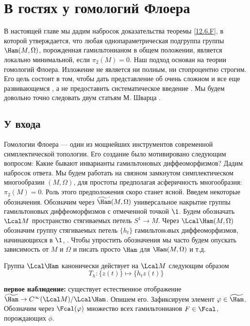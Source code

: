 \chapter[Гомологии Флоера]{В гостях у гомологий Флоера}\label{13}

В настоящей главе мы дадим набросок доказательства теоремы
\ref{12.6.F}, в которой утверждается, что любая однопараметрическая
подгруппа группы $\Ham(M, \Omega)$, порожденная гамильтонианом в общем
положении, является локально минимальной, если $π_{2}(M) = 0$.
Наш подход основан на теории гомологий Флоера.
Изложение не является
ни полным, ни стопроцентно строгим.
Его цель состоит в том, чтобы дать представление об очень сложном и
все еще развивающемся , а не
предоставить систематическое введение .
Мы будем довольно точно следовать двум статьям М. Шварца \cite{Sch2,
  Sch3}.

\section{У входа}\label{13.1}

Гомологии Флоера --- один из мощнейших инструментов современной
симплектической топологии. 
Его создание было мотивировано следующим вопросом: Какие бывают инварианты
гамильтоновых диффеоморфизмов?
Дадим набросок ответа.
Мы будем работать на связном замкнутом симплектическом многообразии
$(M,\Omega)$, для простоты предполагая асферичность многообразия:
$π_{2}(M) = 0$.
Роль этого предположения скоро станет ясной.
Введем некоторые обозначения.
Обозначим через $\widetilde\Ham(M,\Omega)$ универсальное накрытие
группы гамильтоновых диффеоморфизмов с отмеченной точкой $\1$.
Будем обозначать $\Lcal M$ пространство стягиваемых петель $S^{1}\to
M$.
Через $\Lcal\Ham(M,\Omega)$ обозначим группу стягиваемых петель
$\{h_{t}\}$ гамильтонoвых диффеоморфизмов, начинающихся в $\1$,
.
Чтобы упростить обозначения мы часто будем опускать зависимость от $M$
и $\Omega$ и писать просто $\Ham$ для $\Ham(M, \Omega)$ и т.д. 

Группа $\Lcal\Ham$ канонически действует на $\Lcal M$
следующим образом
\[
T_{h}: \{z(t)\}\mapsto \{h_{t}z(t)\}
\]

  
\noindent\textbf{первое наблюдение:} существует естественное
отображение $\widetilde\Ham\z\to C^{\infty}(\Lcal M)/\Lcal\Ham$.
Опишем его. Зафиксируем элемент $\phi\in\widetilde\Ham$. Обозначим
через $\Fcal(\phi)$ множество всех гамильтонианов $F\in\Fcal$,
порождающих $\phi$.

